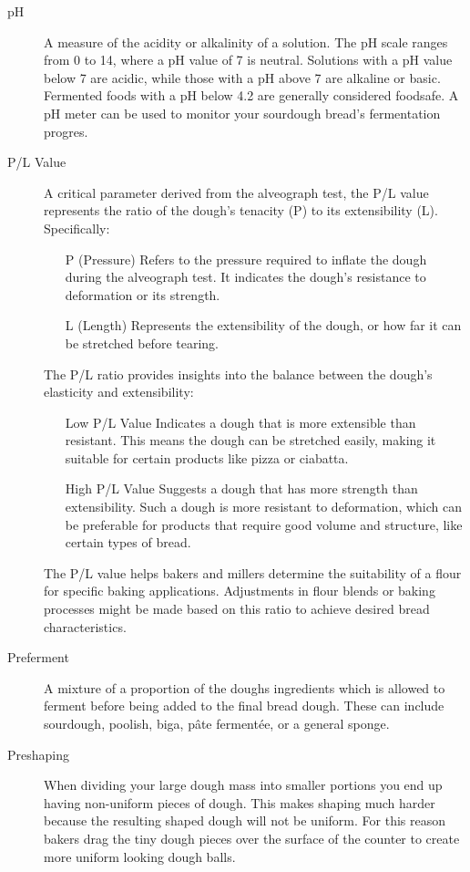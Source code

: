 \begin{description}
\item[pH] A measure of the acidity or alkalinity of a solution. The pH scale
ranges from 0 to 14, where a pH value of 7 is neutral. Solutions with a pH value below
7 are acidic, while those with a pH above 7 are alkaline or basic. Fermented
foods with a pH below 4.2 are generally considered foodsafe. A pH meter can be
used to monitor your sourdough bread's fermentation progres.

\item[P/L Value] A critical parameter derived from the alveograph test, the P/L
value represents the ratio of the dough's tenacity (P) to its extensibility (L).
Specifically:
\begin{itemize}
\item[P (Pressure)] Refers to the pressure required to inflate the dough
    during the alveograph test. It indicates the dough's resistance to deformation or
    its strength.
\item[L (Length)] Represents the extensibility of the dough, or how far it
    can be stretched before tearing.
\end{itemize}
The P/L ratio provides insights into the balance between the dough's elasticity and
extensibility:
%
\begin{itemize}
\item[Low P/L Value] Indicates a dough that is more extensible than
  resistant. This means the dough can be stretched easily, making it suitable for
  certain products like pizza or ciabatta.
\item[High P/L Value] Suggests a dough that has more strength than
  extensibility. Such a dough is more resistant to deformation, which can be
  preferable for products that require good volume and structure, like certain types
  of bread.
\end{itemize}
The P/L value helps bakers and millers determine the suitability of a flour for
specific baking applications. Adjustments in flour blends or baking processes might
be made based on this ratio to achieve desired bread characteristics.

\item[Preferment] A mixture of a proportion of the doughs ingredients which is
allowed to ferment before being added to the final bread dough. These can include
sourdough, poolish, biga, pâte fermentée, or a general sponge.

\item[Preshaping] When dividing your large dough mass into smaller portions you end
up having non-uniform pieces of dough. This makes shaping much harder because the
resulting shaped dough will not be uniform. For this reason bakers drag the tiny dough
pieces over the surface of the counter to create more uniform looking dough balls.


\end{description}

